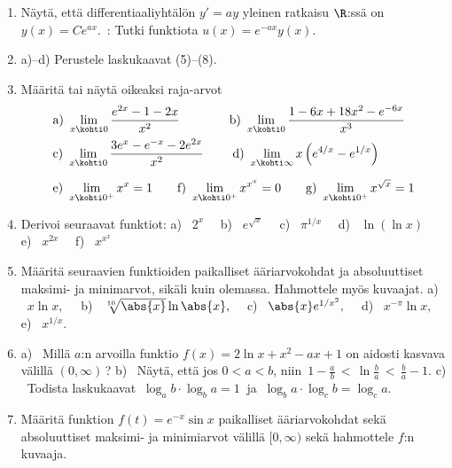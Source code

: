 \Harj
\begin{enumerate}

\item \label{H-exp-2: exp-dy}
Näytä, että differentiaaliyhtälön $y'=ay$ yleinen ratkaisu $\R$:ssä on $y(x)=Ce^{ax}$.\,
: Tutki funktiota $u(x)=e^{-ax}y(x)$.

\item \label{H-exp-2: kaavat}
a)--d) Perustele laskukaavat (5)--(8).

\item \label{H-exp-2: raja-arvoja}
Määritä tai näytä oikeaksi raja-arvot
\begin{align*}
&\text{a)}\ \lim_{x \kohti 0} \frac{e^{2x}-1-2x}{x^2} \qquad\qquad
 \text{b)}\ \lim_{x \kohti 0} \frac{1-6x+18x^2-e^{-6x}}{x^3} \\
&\text{c)}\ \lim_{x \kohti 0} \frac{3e^x-e^{-x}-2e^{2x}}{x^2} \qquad\
 \text{d)}\ \lim_{x\kohti\infty} x\left(e^{4/x}-e^{1/x}\right) \\[2mm]
&\text{e)}\ \lim_{x \kohti 0^+} x^x=1 \qquad 
 \text{f)}\ \lim_{x \kohti 0^+} x^{x^x}=0 \qquad
 \text{g)}\ \lim_{x \kohti 0^+} x^{\sqrt{x}}=1
\end{align*}

\item
Derivoi seuraavat funktiot: \newline
a) \ $2^x \quad$ 
b) \ $e^{\sqrt{x}} \quad$ 
c) \ $\pi^{1/x} \quad$ 
d) \ $\ln(\ln x)\quad$
e) \ $x^{2x} \quad$ 
f) \ $x^{x^x}$

\item
Määritä seuraavien funktioiden paikalliset ääriarvokohdat ja absoluuttiset maksimi- ja 
minimarvot, sikäli kuin olemassa. Hahmottele myös kuvaajat. \newline
a) \ $x\ln x,\quad$ b) \ $\sqrt[10]{\abs{x}}\ln\abs{x},\quad$ c) \ $\abs{x}e^{1/x^2},\quad$
d) \ $x^{-\pi}\ln x,\quad$ e) \ $x^{1/x}$. 

\item
a) \ Millä $a$:n arvoilla funktio $f(x)=2\ln x +x^2-ax+1$ on aidosti kasvava välillä
$(0,\infty)\,$? \newline
b) \ Näytä, että jos $0<a<b$, niin 
$\,\displaystyle{1-\frac{a}{b}\,<\,\ln \frac{b}{a}\,<\,\frac{b}{a}-1}$. \newline
c) \ Todista laskukaavat $\ \log_a b\cdot\log_b a=1\ $ ja $\ \log_b a\cdot\log_c b=\log_c a$.

\item
Määritä funktion $f(t)=e^{-x}\sin x$ paikalliset ääriarvokohdat sekä absoluuttiset maksimi-
ja minimiarvot välillä $[0,\infty)$ sekä hahmottele $f$:n kuvaaja.


\end{enumerate}
